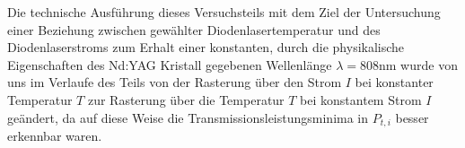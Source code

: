 \documentclass[../../main.tex]{subfiles}
\begin{document}

    Die technische Ausführung dieses Versuchsteils mit dem Ziel der Untersuchung einer Beziehung zwischen gewählter Diodenlasertemperatur und des Diodenlaserstroms zum Erhalt einer konstanten, durch die physikalische Eigenschaften des Nd:YAG Kristall gegebenen Wellenlänge $\lambda = 808\si{\nm}$ wurde von uns im Verlaufe des Teils von der Rasterung über den Strom $I$ bei konstanter Temperatur $T$ zur Rasterung über die Temperatur $T$ bei konstantem Strom $I$ geändert, da auf diese Weise die Transmissionsleistungsminima in $P_{t,i}$ besser erkennbar waren.
\end{document}
